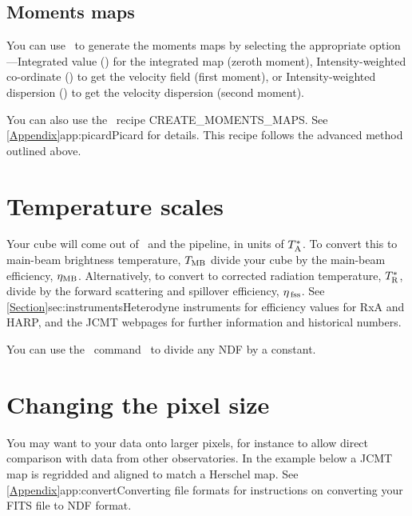 \documentclass[11pt,oneside,chapters]{starlink}
\begin{document}
\subsection{Moments maps}
\label{sec:momentsmap}

You can use \collapse\ to generate the moments maps by selecting the
appropriate  option---Integrated value
() for the integrated map (zeroth moment),
Intensity-weighted co-ordinate () to get the velocity field
(first moment), or Intensity-weighted dispersion () to get the
velocity dispersion (second moment).

\begin{tip}
You can also use the \picard\ recipe CREATE\_MOMENTS\_MAPS. See
\cref{Appendix}{app:picard}{Picard} for details. This recipe follows
the advanced method outlined above.
\end{tip}


\section{Temperature scales}
\label{sec:mult}

Your cube will come out of \makecube\, and the pipeline, in units of
$T_{\textnormal{A}}^*$. To convert this to main-beam brightness temperature, $T_{\textnormal{MB}}$
divide your cube by the main-beam efficiency, $\eta_{\textnormal{MB}}$. Alternatively,
to convert to corrected radiation temperature, $T_{\textnormal{R}}^*$, divide by the forward
scattering and spillover efficiency, $\eta_{\textnormal{\,fss}}$.  See
\cref{Section}{sec:instruments}{Heterodyne instruments} for efficiency
values for RxA and HARP, and the JCMT webpages for further information
and historical numbers.

You can use the \Kappa\ command \cdiv\ to divide any NDF by a constant.

\begin{terminalv}
\end{terminalv}

\section{Changing the pixel size}
\label{sec:rebin}

You may want to  your data onto
larger pixels, for instance to
allow direct comparison with data from other observatories. In the
example below a JCMT map is regridded and aligned to match a Herschel
map. See \cref{Appendix}{app:convert}{Converting file formats} for
instructions on converting your FITS file to NDF format.
\begin{terminalv}
\end{terminalv}
\end{document}
